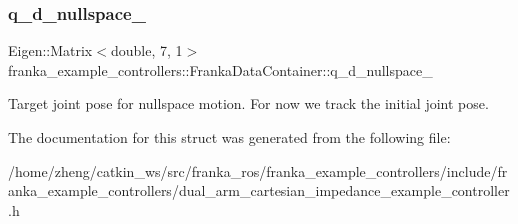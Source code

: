 \subsubsection{\texorpdfstring{q\+\_\+d\+\_\+nullspace\+\_\+}{q\_d\_nullspace\_}}
{\footnotesize\ttfamily Eigen\+::\+Matrix$<$double, 7, 1$>$ franka\+\_\+example\+\_\+controllers\+::\+Franka\+Data\+Container\+::q\+\_\+d\+\_\+nullspace\+\_\+}

Target joint pose for nullspace motion. For now we track the initial joint pose. 

The documentation for this struct was generated from the following file\+:\begin{DoxyCompactItemize}
\item 
/home/zheng/catkin\+\_\+ws/src/franka\+\_\+ros/franka\+\_\+example\+\_\+controllers/include/franka\+\_\+example\+\_\+controllers/dual\+\_\+arm\+\_\+cartesian\+\_\+impedance\+\_\+example\+\_\+controller.\+h\end{DoxyCompactItemize}
